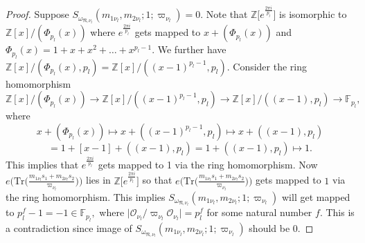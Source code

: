 \documentclass[10pt,a4paper]{amsart}
\begin{document}
\begin{proof}
 Suppose $S_{\omega_{\mathfrak{N},\nu_l}} (m_{1\nu_l},m_{2\nu_l};1;\varpi_{\nu_l})= 0.$ 
Note that $\mathbb{Z}\Big[e^{\frac{2\pi i}{p_l}}\Big]$ is isomorphic to $\mathbb{Z}[x]/(\Phi_{p_l}(x))$ where  $e^{\frac{2\pi i}{p_l}}$ gets mapped to $x+(\Phi_{p_l}(x))$ and $\Phi_{p_l}(x)=1+x+x^2+\dots+x^{p_l-1}. $ We further have
$\mathbb{Z}[x]/(\Phi_{p_l}(x),p_l)=\mathbb{Z}[x]/((x-1)^{p_l-1},p_l)$. Consider the ring homomorphism  $$
\mathbb{Z}[x]/(\Phi_{p_l}(x))\rightarrow \mathbb{Z}[x]/((x-1)^{p_l-1},p_l) \rightarrow \mathbb{Z}[x]/((x-1),p_l)\rightarrow \mathbb{F}_{p_l},
$$
where $$x+(\Phi_{p_l}(x))\mapsto x+((x-1)^{p_l-1},p_l) \mapsto x+((x-1),p_l)$$ $$=1+[x-1]+((x-1),p_l)=1+((x-1),p_l)\mapsto 1.$$
This implies that $e^{\frac{2\pi i}{p_l}}$ gets mapped to 1 via the ring homomorphism.
Now  $e\Bigg(\mathrm{Tr}\Big( \frac{m_{1\nu_l} s_{1}+m_{2\nu_l} s_{2}}{\varpi_{\nu_l}}  \Big)\Bigg)$ lies in  $\mathbb{Z}\Big[e^{\frac{2\pi i}{p_l}}\Big]$ so that $e\Bigg(\mathrm{Tr}\Big( \frac{m_{1\nu_l} s_{1}+m_{2\nu_l} s_{2}}{\varpi_{\nu_l}}  \Big)\Bigg)$ gets mapped to $1$ via the ring homomorphism. This implies  $S_{\omega_{\mathfrak{N},\nu_l}} (m_{1\nu_l},m_{2\nu_l};1;\varpi_{\nu_l})$ will get mapped to $p_l^f-1=-1 \in \mathbb{F}_{p_l},$ where 
$\big|\mathcal{O}_{\nu_l} / \varpi_{\nu_l} \mathcal{O}_{\nu_l}\big|=p_l^f$ for some natural number $f.$ This is a contradiction since image of  $S_{\omega_{\mathfrak{N},\nu_l}} (m_{1\nu_l},m_{2\nu_l};1;\varpi_{\nu_l}) $ should be $0.$
\end{proof}
\end{document}
